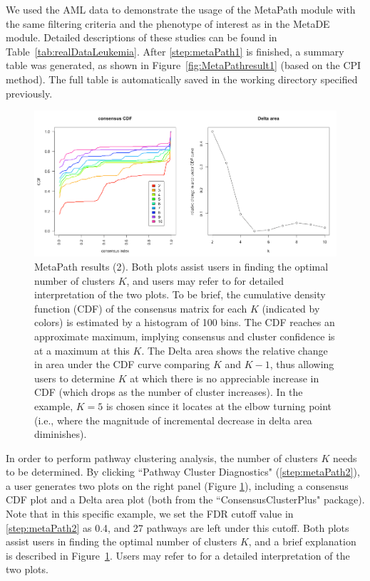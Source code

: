 We used the AML data to demonstrate the usage of the MetaPath module
with the same filtering criteria and the phenotype of interest as in the MetaDE module.
Detailed descriptions of these studies can be found in Table~\ref{tab:realDataLeukemia}. 
After \ref{step:metaPath1} is finished, a summary table was generated, 
as shown in Figure~\ref{fig:MetaPathresult1} (based on the CPI method). 
The full table is automatically saved in the working directory specified previously.  

\begin{figure}[H]
\begin{center}
\includegraphics[scale=0.5]{./figure/metaPath/metaPathresult2.png}
\caption{MetaPath results (2).
Both plots assist users in finding the optimal number of clusters $K$, 
and users may refer to \cite{monti2003consensus} for detailed interpretation of the two plots. 
To be brief, the cumulative density function (CDF) of the consensus matrix for each $K$ (indicated by colors) is estimated by a histogram of 100 bins. 
The CDF reaches an approximate maximum, 
implying consensus and cluster confidence is at a maximum at this $K$. 
The Delta area shows the relative change in area under the CDF curve comparing $K$ and $K - 1$, thus allowing users to determine $K$ at which there is no appreciable increase in CDF (which drops as the number of cluster increases).
In the example, $K=5$ is chosen since it locates at the elbow turning point (i.e., where the magnitude of incremental decrease in delta area diminishes).
}
\label{fig:MetaPathresult2}
\end{center}
\end{figure}

In order to perform pathway clustering analysis, 
the number of clusters $K$ needs to be determined. 
By clicking ``Pathway Cluster Diagnostics" (\ref{step:metaPath2}), 
a user generates two plots on the right panel (Figure \ref{fig:MetaPathresult2}), 
including a consensus CDF plot and a Delta area plot (both from the ``ConsensusClusterPlus" package). 
Note that in this specific example, we set the FDR cutoff value in \ref{step:metaPath2} as 0.4, 
and 27 pathways are left under this cutoff.
Both plots assist users in finding the optimal number of clusters $K$, 
and a brief explanation is described in Figure~\ref{fig:MetaPathresult2}.
Users may refer to \cite{monti2003consensus} for a detailed interpretation of the two plots. 


